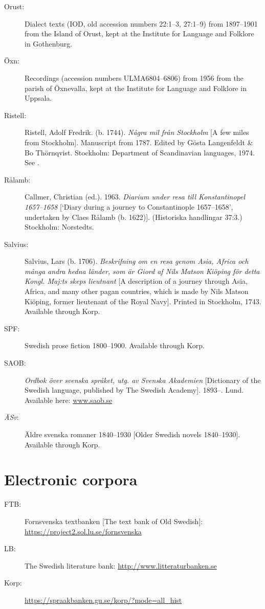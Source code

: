 \documentclass[output=paper]{langscibook}
\begin{document}
\begin{description}
\item[Orust:] Dialect texts (IOD, old accession numbers 22:1–3, 27:1–9) from 1897–1901 from the Island of Orust, kept at the Institute for Language and Folklore in Gothenburg.
\item[Öxn:] Recordings (accession numbers ULMA6804–6806) from 1956 from the parish of Öxnevalla, kept at the Institute for Language and Folklore in Uppsala.
\item[Ristell:] Ristell, Adolf Fredrik. (b. 1744). \textit{Några mil från Stockholm} [A few miles from Stockholm]. Manuscript from 1787. Edited by Gösta Langenfeldt \& Bo Thörnqvist. Stockholm: Department of Scandinavian languages, 1974. See \citet{MarttalaStromquist2001}.
\item[Rålamb:] Callmer, Christian (ed.). 1963. \textit{Diarium under resa till Konstantinopel 1657–1658} [`Diary during a journey to Constantinople 1657–1658’, undertaken by Claes Rålamb (b. 1622)]. (Historiska handlingar 37:3.) Stockholm: Norstedts.
\item[Salvius:] Salvius, Lars (b. 1706). \textit{Beskrifning om en resa genom Asia, Africa och många andra hedna länder, som är Giord af Nils Matson Kiöping för detta Kongl. Maj:ts skeps lieutnant} [A description of a journey through Asia, Africa, and many other pagan countries, which is made by Nils Matson Kiöping, former lieutenant of the Royal Navy]. Printed in Stockholm, 1743. Available through Korp.
\item[SPF:] Swedish prose fiction 1800–1900. Available through Korp.
\item[SAOB:] \textit{Ordbok över svenska språket, utg. av Svenska Akademien} [Dictionary of the Swedish language, published by The Swedish Academy]. 1893–. Lund. Available here: \href{http://www.saob.se}{{www.saob.se}}
\item[\textit{ÄSv}:] Äldre svenska romaner 1840–1930 [Older Swedish novels 1840–1930]. Available through Korp.
\end{description}

\section*{Electronic corpora}

\begin{description}
\item[FTB:] Fornsvenska textbanken [The text bank of Old Swedish]: \url{https://project2.sol.lu.se/fornsvenska} 
\item[LB:] The Swedish literature bank: \url{http://www.litteraturbanken.se}
\item[Korp:] \url{https://spraakbanken.gu.se/korp/?mode=all_hist}
\end{description}

\sloppy\printbibliography[heading=subbibliography,notkeyword=this]
\end{document}
